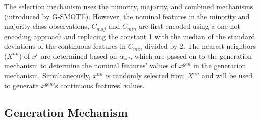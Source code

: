 \documentclass[preprint,12pt]{elsarticle}
\begin{document}
{\begin{algorithm}

\end{algorithm}

The selection mechanism uses the minority, majority, and combined mechanisms
(introduced by G-SMOTE). However, the nominal features in the minority and
majority class observations, $C_{maj}$ and $C_{min}$ are first encoded using a
one-hot encoding approach and replacing the constant 1 with the median of the
standard deviations of the continuous features in $C_{min}$ divided by 2. The
nearest-neighbors ($X^{nn}$) of $x^c$ are determined based on $\alpha_{sel}$,
which are passed on to the generation mechanism to determine the nominal
features' values of $x^{gen}$ in the generation mechanism. Simultaneously,
$x^{nn}$ is randomly selected from $X^{nn}$ and will be used to generate
$x^{gen}$'s continuous features' values.

\subsection{Generation Mechanism}

}
\end{document}

